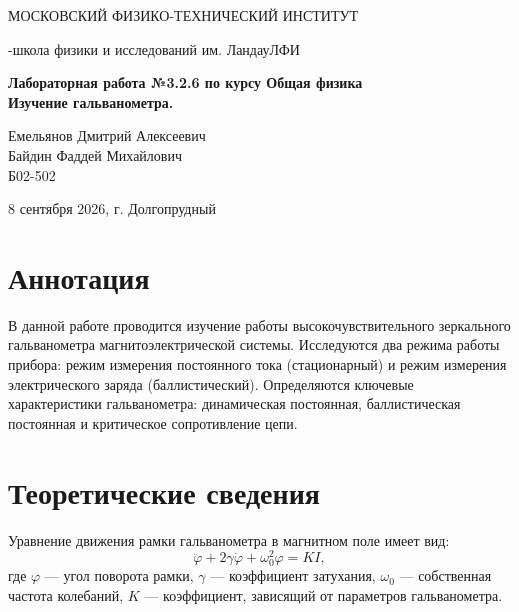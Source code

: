 \documentclass[a4paper,12pt]{article}
\begin{document}
\begin{titlepage}
\begin{center}
    {\large МОСКОВСКИЙ ФИЗИКО-ТЕХНИЧЕСКИЙ ИНСТИТУТ}
\end{center}
\begin{center}
    {-школа физики и исследований им. Ландау\break ЛФИ}
\end{center}


    \vspace{3cm}

\begin{center}
   
\end{center}
\vspace{0.15cm}
{
\begin{center}
    \huge \bf Лабораторная работа №3.2.6 по курсу Общая физика\\
    \vspace{0.4cm}      
    \LARGE Изучение гальванометра.
\end{center}
}
\vspace{1.5cm}
\begin{flushright}  
Емельянов Дмитрий Алексеевич\\
Байдин Фаддей Михайлович\\
\vspace{0.4cm}
Б02-502
\end{flushright}
\vspace{10cm}
\begin{center}
    \large 8 сентября 2026, г. Долгопрудный
\end{center}
\end{titlepage}

\section{Аннотация}
В данной работе проводится изучение работы высокочувствительного зеркального гальванометра магнитоэлектрической системы. Исследуются два режима работы прибора: режим измерения постоянного тока (стационарный) и режим измерения электрического заряда (баллистический). Определяются ключевые характеристики гальванометра: динамическая постоянная, баллистическая постоянная и критическое сопротивление цепи.

\section{Теоретические сведения}
Уравнение движения рамки гальванометра в магнитном поле имеет вид:
\begin{equation}
    \label{eq:motion}
    \ddot{\varphi} + 2\gamma\dot{\varphi} + \omega_0^2\varphi = KI,
\end{equation}
где $\varphi$ --- угол поворота рамки, $\gamma$ --- коэффициент затухания, $\omega_0$ --- собственная частота колебаний, $K$ --- коэффициент, зависящий от параметров гальванометра.
\end{document}
